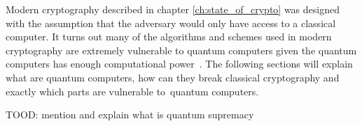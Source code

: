 Modern cryptography described in chapter \ref{ch:state_of_crypto} was designed with the assumption that the adversary would only have access to a classical computer. It turns out many of the algorithms and schemes used in modern cryptography are extremely vulnerable to quantum computers given the quantum computers has enough computational power~\cite{Bernstein2009}. The following sections will explain what are quantum computers, how can they break classical cryptography and exactly which parts are vulnerable to~quantum computers.

TOOD: mention and explain what is quantum supremacy




